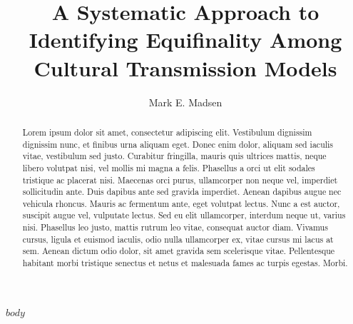 \documentclass[reprint,titlepage,authoryear,12pt]{elsarticle}
\def\doctitle{A Systematic Approach to Identifying Equifinality Among Cultural Transmission Models}
\begin{document}
\newtheorem{resquestion}{Research Question}



\begin{frontmatter}


\title{\doctitle{}}


\author{Mark E. Madsen}

\address{Department of Anthropology, Box 353100, University of Washington, Seattle WA, 98195 USA}

\begin{abstract}
Lorem ipsum dolor sit amet, consectetur adipiscing elit. Vestibulum dignissim dignissim nunc, et finibus urna aliquam eget. Donec enim dolor, aliquam sed iaculis vitae, vestibulum sed justo. Curabitur fringilla, mauris quis ultrices mattis, neque libero volutpat nisi, vel mollis mi magna a felis. Phasellus a orci ut elit sodales tristique ac placerat nisi. Maecenas orci purus, ullamcorper non neque vel, imperdiet sollicitudin ante. Duis dapibus ante sed gravida imperdiet. Aenean dapibus augue nec vehicula rhoncus. Mauris ac fermentum ante, eget volutpat lectus. Nunc a est auctor, suscipit augue vel, vulputate lectus. Sed eu elit ullamcorper, interdum neque ut, varius nisi. Phasellus leo justo, mattis rutrum leo vitae, consequat auctor diam. Vivamus cursus, ligula et euismod iaculis, odio nulla ullamcorper ex, vitae cursus mi lacus at sem. Aenean dictum odio dolor, sit amet gravida sem scelerisque vitae. Pellentesque habitant morbi tristique senectus et netus et malesuada fames ac turpis egestas. Morbi.\end{abstract}








\end{frontmatter}

\clearpage
%



$body$


\end{document}
